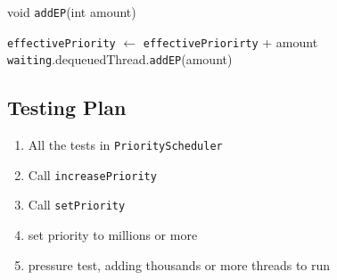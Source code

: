 \documentclass{article}
\begin{document}
\begin{spacing}{1.1}
\begin{algorithm}[htbp]
  \caption{void \texttt{addEP}(int amount)}
\begin{algorithmic}[1]
  \STATE  \texttt{effectivePriority} $\leftarrow$ \texttt{effectivePriorirty} + amount
  \STATE \texttt{waiting}.dequeuedThread.\texttt{addEP}(amount)
\end{algorithmic}
\end{algorithm}


\subsection{Testing Plan}
\begin{enumerate}
\item All the tests in \texttt{PriorityScheduler}
\item Call \texttt{increasePriority}
\item Call \texttt{setPriority}
\item set priority to millions or more
\item pressure test, adding thousands or more threads to run
\end{enumerate}

\end{spacing}
\end{document}
